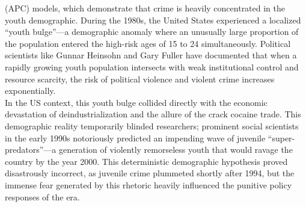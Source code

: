 \documentclass[
]{article}
\begin{document}
(APC) models, which demonstrate that crime is heavily concentrated in
the youth demographic. During the 1980s, the United States experienced a
localized ``youth bulge''---a demographic anomaly where an unusually
large proportion of the population entered the high-risk ages of 15 to
24 simultaneously. Political scientists like Gunnar Heinsohn and Gary
Fuller have documented that when a rapidly growing youth population
intersects with weak institutional control and resource scarcity, the
risk of political violence and violent crime increases exponentially.\\
In the US context, this youth bulge collided directly with the economic
devastation of deindustrialization and the allure of the crack cocaine
trade. This demographic reality temporarily blinded researchers;
prominent social scientists in the early 1990s notoriously predicted an
impending wave of juvenile ``super-predators''---a generation of
violently remorseless youth that would ravage the country by the year
2000. This deterministic demographic hypothesis proved disastrously
incorrect, as juvenile crime plummeted shortly after 1994, but the
immense fear generated by this rhetoric heavily influenced the punitive
policy responses of the era.
\end{document}
